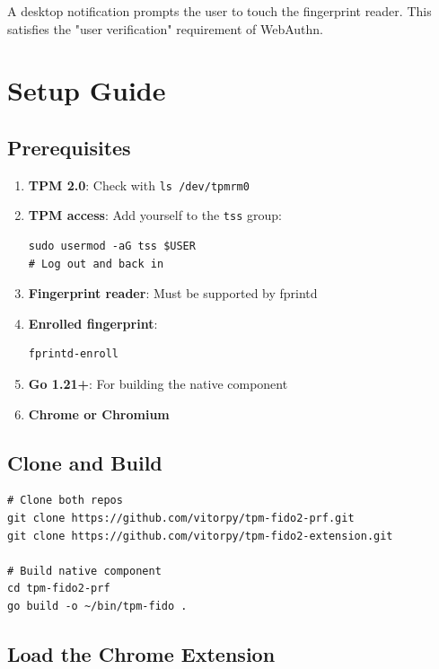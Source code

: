 \documentclass{article}
\begin{document}
A desktop notification prompts the user to touch the fingerprint reader. This satisfies the "user verification" requirement of WebAuthn.

\section{Setup Guide}

\subsection{Prerequisites}

\begin{enumerate}
\item \textbf{TPM 2.0}: Check with \texttt{ls /dev/tpmrm0}

\item \textbf{TPM access}: Add yourself to the \texttt{tss} group:

\begin{verbatim}
sudo usermod -aG tss $USER
# Log out and back in
\end{verbatim}

\item \textbf{Fingerprint reader}: Must be supported by fprintd

\item \textbf{Enrolled fingerprint}:

\begin{verbatim}
fprintd-enroll
\end{verbatim}

\item \textbf{Go 1.21+}: For building the native component

\item \textbf{Chrome or Chromium}

\end{enumerate}

\subsection{Clone and Build}

\begin{verbatim}
# Clone both repos
git clone https://github.com/vitorpy/tpm-fido2-prf.git
git clone https://github.com/vitorpy/tpm-fido2-extension.git

# Build native component
cd tpm-fido2-prf
go build -o ~/bin/tpm-fido .
\end{verbatim}

\subsection{Load the Chrome Extension}
\end{document}
